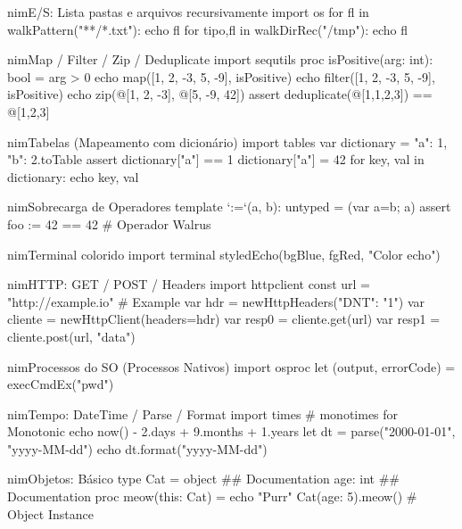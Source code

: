 \documentclass[10pt, a4paper]{article}
\begin{document}
\begin{multicols}{4}
\begin{codebox}{nim}{E/S: Lista pastas e arquivos recursivamente}
import os
for fl in walkPattern("**/*.txt"): echo fl
for tipo,fl in walkDirRec("/tmp"): echo fl
\end{codebox}


\begin{codebox}{nim}{Map / Filter / Zip / Deduplicate}
import sequtils
proc isPositive(arg: int): bool = arg > 0
echo map([1, 2, -3, 5, -9], isPositive)
echo filter([1, 2, -3, 5, -9], isPositive)
echo zip(@[1, 2, -3], @[5, -9, 42])
assert deduplicate(@[1,1,2,3]) == @[1,2,3]
\end{codebox}


\begin{codebox}{nim}{Tabelas (Mapeamento com dicionário)}
import tables
var dictionary = {"a": 1, "b": 2}.toTable
assert dictionary["a"] == 1
dictionary["a"] = 42
for key, val in dictionary: echo key, val
\end{codebox}


\begin{codebox}{nim}{Sobrecarga de Operadores}
template `:=`(a, b): untyped = (var a=b; a)
assert foo := 42 == 42  # Operador Walrus
\end{codebox}


\begin{codebox}{nim}{Terminal colorido}
import terminal
styledEcho(bgBlue, fgRed, "Color echo")
\end{codebox}


\begin{codebox}{nim}{HTTP: GET / POST / Headers}
import httpclient
const url = "http://example.io" # Example
var hdr = newHttpHeaders({"DNT": "1"})
var cliente = newHttpClient(headers=hdr)
var resp0 = cliente.get(url)
var resp1 = cliente.post(url, "data")
\end{codebox}


\begin{codebox}{nim}{Processos do SO (Processos Nativos)}
import osproc
let (output, errorCode) = execCmdEx("pwd")
\end{codebox}


\begin{codebox}{nim}{Tempo: DateTime / Parse / Format}
import times # monotimes for Monotonic
echo now() - 2.days + 9.months + 1.years
let dt = parse("2000-01-01", "yyyy-MM-dd")
echo dt.format("yyyy-MM-dd")
\end{codebox}


\begin{codebox}{nim}{Objetos: Básico}
  type Cat = object ## Documentation
    age: int ## Documentation
  proc meow(this: Cat) = echo "Purr"
  Cat(age: 5).meow() # Object Instance
\end{codebox}



\end{multicols}
\end{document}
